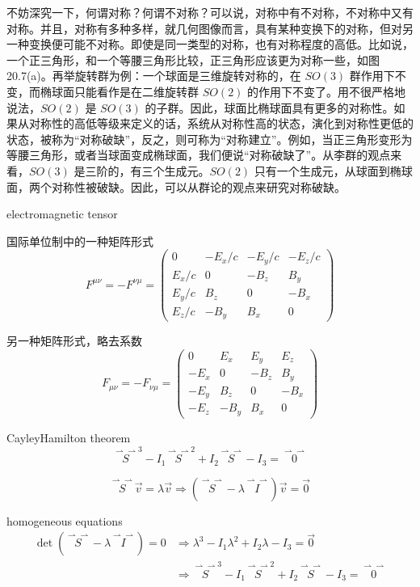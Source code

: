 \documentclass[12pt, a4paper, oneside, UTF8]{ctexbook}  %
\newcommand{\vvec}{\overset{\rightharpoonup\!\!\!\! \rightharpoonup}}
\begin{document}
\begin{add}
不妨深究一下，何谓对称？何谓不对称？可以说，对称中有不对称，不对称中又有对称。并且，对称有多种多样，就几何图像而言，具有某种变换下的对称，但对另一种变换便可能不对称。即使是同一类型的对称，也有对称程度的高低。比如说，一个正三角形，和一个等腰三角形比较，正三角形应该更为对称一些，如图 20.7(a)。再举旋转群为例：一个球面是三维旋转对称的，在 \(SO(3)\) 群作用下不变，而椭球面只能看作是在二维旋转群 \(SO(2)\) 的作用下不变了。用不很严格地说法，\(SO(2)\) 是 \(SO(3)\) 的子群。因此，球面比椭球面具有更多的对称性。如果从对称性的高低等级来定义的话，系统从对称性高的状态，演化到对称性更低的状态，被称为“对称破缺”，反之，则可称为“对称建立”。例如，当正三角形变形为等腰三角形，或者当球面变成椭球面，我们便说“对称破缺了”。从李群的观点来看，\(SO(3)\) 是三阶的，有三个生成元。\(SO(2)\) 只有一个生成元，从球面到椭球面，两个对称性被破缺。因此，可以从群论的观点来研究对称破缺。
\end{add}
\begin{defn}
    electromagnetic tensor
    
    国际单位制中的一种矩阵形式
\[F^{\mu\nu} = -F^{\nu\mu}=
\begin{pmatrix}
0 & -E_x/c & -E_y/c & -E_z/c \\
E_x/c & 0 & -B_z & B_y \\
E_y/c & B_z & 0 & -B_x \\
E_z/c & -B_y & B_x & 0
\end{pmatrix}
\]

另一种矩阵形式，略去系数
\[F_{\mu\nu} = -F_{\nu\mu}=
\begin{pmatrix}
    0 & E_x & E_y & E_z \\
    -E_x & 0 & -B_z & B_y \\
    -E_y & B_z & 0 & -B_x \\
    -E_z & -B_y & B_x & 0
    \end{pmatrix}
    \]    
\end{defn}
\begin{defn}
    Cayley\textminus Hamilton theorem
    \[\boxed{\vvec{S}^3-I_1\vvec{S}^2+I_2\vvec{S}-I_3=\vvec{0}}\]
    \begin{tui}
        \[\vvec{S}\vec{v}=\lambda\vec{v}\Rightarrow\left(\vvec{S}-\lambda\vvec{I}\right)\vec{v}=\vec{0}\]
        
        homogeneous equations
\begin{align*}
    \det\left(\vvec{S}-\lambda\vvec{I}\right)=0&\Rightarrow
    \lambda^3-I_1\lambda^2+I_2\lambda-I_3=\vec{0}\\
    &\Rightarrow\vvec{S}^3-I_1\vvec{S}^2+I_2\vvec{S}-I_3=\vvec{0}
\end{align*}
    \end{tui}
\end{defn}
\end{document}
